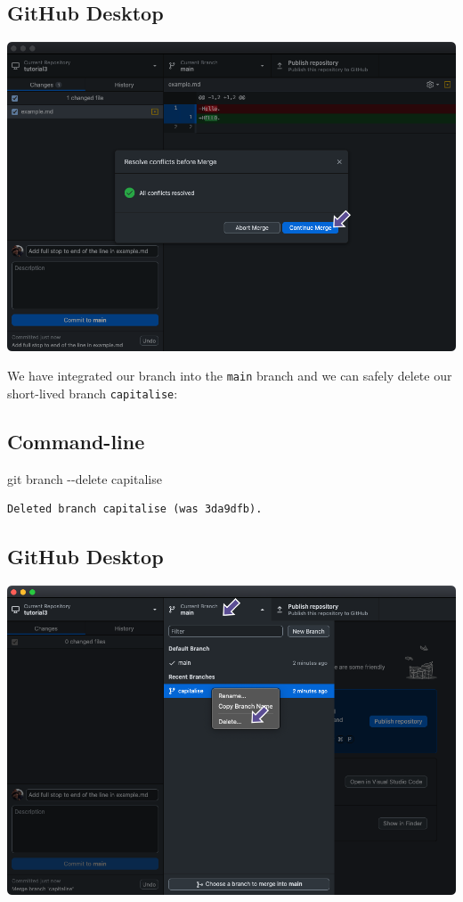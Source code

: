 \documentclass[
  letterpaper,
  DIV=11,
  numbers=noendperiod]{scrartcl}
\newenvironment{Shaded}{\begin{snugshade}}{\end{snugshade}}
\newcommand{\NormalTok}[1]{\textcolor[rgb]{0.00,0.23,0.31}{#1}}
\newcommand{\SpecialCharTok}[1]{\textcolor[rgb]{0.37,0.37,0.37}{#1}}
\begin{document}
\subsection{GitHub Desktop}

\includegraphics{images/image56.png}

We have integrated our branch into the \texttt{main} branch and we can
safely delete our short-lived branch \texttt{capitalise}:

\subsection{Command-line}

\begin{Shaded}
\begin{Highlighting}[]
\NormalTok{git branch }\SpecialCharTok{{-}{-}}\NormalTok{delete capitalise}
\end{Highlighting}
\end{Shaded}

\begin{verbatim}
Deleted branch capitalise (was 3da9dfb).
\end{verbatim}

\subsection{GitHub Desktop}

\includegraphics{images/image57.png}
\end{document}
